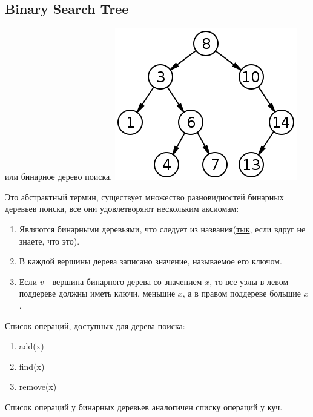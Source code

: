 
\subsection{Binary Search Tree}
\begin{center}
  или бинарное дерево поиска.
\includegraphics{assets/Binary_search_tree.png}    
\end{center}

Это абстрактный термин, существует множество разновидностей бинарных деревьев поиска, все они удовлетворяют нескольким аксиомам:
\begin{enumerate}
    \item Являются бинарными деревьями, что следует из названия(\href{https://ru.wikipedia.org/wiki/%D0%94%D0%B2%D0%BE%D0%B8%D1%87%D0%BD%D0%BE%D0%B5_%D0%B4%D0%B5%D1%80%D0%B5%D0%B2%D0%BE}{тык}, если вдруг не знаете, что это).
    \item В каждой вершины дерева записано значение, называемое его ключом.
    \item Если $v$ - вершина бинарного дерева со значением $x$, то все
    узлы в левом поддереве должны иметь ключи, меньшие $x$, а в правом поддереве
    большие $x$.
\end{enumerate}
Список операций, доступных для дерева поиска:
\begin{enumerate}
    \item add(x)
    \item find(x)
    \item remove(x)
\end{enumerate}
Список операций у бинарных деревьев аналогичен списку операций у куч. 

